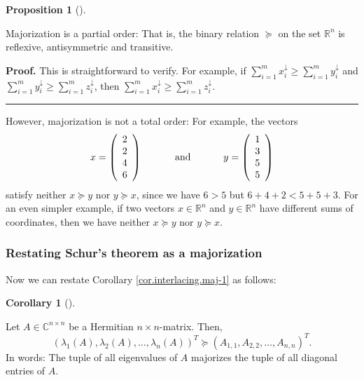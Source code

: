 \documentclass[numbers=enddot,12pt,final,onecolumn,notitlepage]{scrartcl}%
\numberwithin{exer}{subsection}
\theoremstyle{definition}
\newtheorem{prop}[theo]{Proposition}
\newenvironment{proposition}[1][]
{\begin{prop}[#1]\begin{leftbar}}
{\end{leftbar}\end{prop}}
\newtheorem{coro}[theo]{Corollary}
\newenvironment{corollary}[1][]
{\begin{coro}[#1]\begin{leftbar}}
{\end{leftbar}\end{coro}}
\newenvironment{proof}[1][Proof]{\noindent\textbf{#1.} }{\ \rule{0.5em}{0.5em}}
\let\sumnonlimits\sum
\renewcommand{\sum}{\sumnonlimits\limits}
\begin{document}
\begin{proposition}
Majorization is a partial order: That is, the binary relation $\succcurlyeq$
on the set $\mathbb{R}^{n}$ is reflexive, antisymmetric and transitive.
\end{proposition}

\begin{proof}
This is straightforward to verify. For example, if $\sum_{i=1}^{m}%
x_{i}^{\downarrow}\geq\sum_{i=1}^{m}y_{i}^{\downarrow}$ and $\sum_{i=1}%
^{m}y_{i}^{\downarrow}\geq\sum_{i=1}^{m}z_{i}^{\downarrow}$, then $\sum
_{i=1}^{m}x_{i}^{\downarrow}\geq\sum_{i=1}^{m}z_{i}^{\downarrow}$.
\end{proof}

However, majorization is not a total order: For example, the vectors%
\[
x=\left(
\begin{array}
[c]{c}%
2\\
2\\
4\\
6
\end{array}
\right)  \ \ \ \ \ \ \ \ \ \ \text{and}\ \ \ \ \ \ \ \ \ \ y=\left(
\begin{array}
[c]{c}%
1\\
3\\
5\\
5
\end{array}
\right)
\]
satisfy neither $x\succcurlyeq y$ nor $y\succcurlyeq x$, since we have $6>5$
but $6+4+2<5+5+3$. For an even simpler example, if two vectors $x\in
\mathbb{R}^{n}$ and $y\in\mathbb{R}^{n}$ have different sums of coordinates,
then we have neither $x\succcurlyeq y$ nor $y\succcurlyeq x$.

\subsubsection{Restating Schur's theorem as a majorization}

Now we can restate Corollary \ref{cor.interlacing.maj-1} as follows:

\begin{corollary}
[Schur's theorem]\label{cor.interlacing.maj-2}Let $A\in\mathbb{C}^{n\times n}$
be a Hermitian $n\times n$-matrix. Then,%
\[
\left(  \lambda_{1}\left(  A\right)  ,\lambda_{2}\left(  A\right)
,\ldots,\lambda_{n}\left(  A\right)  \right)  ^{T}\succcurlyeq\left(
A_{1,1},A_{2,2},\ldots,A_{n,n}\right)  ^{T}.
\]
In words: The tuple of all eigenvalues of $A$ majorizes the tuple of all
diagonal entries of $A$.
\end{corollary}
\end{document}
